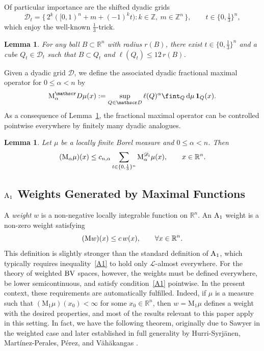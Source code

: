 \documentclass[11pt, a4paper, reqno]{amsart}
\newcommand{\R}{\mathbb R}
\newcommand{\Z}{\mathbb Z}
\newcommand{\Dy}{\mathscr D}
\newcommand{\A}{\textup A}
\newcommand{\dmu}{\,{\mathrm d\mu}}
\newcommand{\BV}{\textup{BV}}
\newtheorem{lemma}[theorem]{Lemma}
\theoremstyle{definition}
\theoremstyle{remark}
\begin{document}
Of particular importance are the shifted dyadic grids
\begin{equation*}\label{shiftdyadic}
\Dy_t = \{\,2^k([0,1)^n + m + (-1)^k t) : k\in\Z,\ m\in\Z^n\,\},
\qquad t\in\{0,\tfrac13\}^n,
\end{equation*}
which enjoy the well-known $\tfrac13$-trick.

\begin{lemma}\label{13trick}
For any ball $B\subset \R^n$ with radius $r(B)$, there exist $t\in\{0,\tfrac13\}^n$ and a cube $Q_t\in\Dy_t$ such that $B\subset Q_t$ and $\ell(Q_t)\le 12\,r(B)$.
\end{lemma}

Given a dyadic grid $\Dy$, we define the associated dyadic fractional maximal operator for $0\le\alpha<n$ by
\[
\textup{M}_\alpha^\Dy \mu(x)
:= \sup_{Q\in\Dy} \ell(Q)^\alpha \fint_Q \dmu \,\mathbf 1_Q(x).
\]
As a consequence of Lemma~\ref{13trick}, the fractional maximal operator can be controlled pointwise everywhere by finitely many dyadic analogues.

\begin{lemma}\label{dyadicbd}
Let $\mu$ be a locally finite Borel measure and $0\le\alpha<n$. Then
\[
(\textup{M}_\alpha \mu)(x)
\le c_{n,\alpha}\sum_{t\in\{0,\frac13\}^n} \textup{M}_\alpha^{\Dy_t}\mu(x),
\qquad x\in\R^n.
\]
\end{lemma}

\subsection{$\A_1$ Weights Generated by Maximal Functions}


A \emph{weight} $w$ is a non-negative locally integrable function on $\R^n$. An $\A_1$ weight is a non-zero weight satisfying
\begin{equation}\label{A1}
(\textup{M}w)(x)\le c\,w(x), \qquad \forall x\in \R^n.
\end{equation}
This definition is slightly stronger than the standard definition of $\A_1$, which typically requires inequality~\eqref{A1} to hold only $\mathcal L$-almost everywhere. For the theory of weighted $\BV$ spaces, however, the weights must be defined everywhere, be lower semicontinuous, and satisfy condition~\eqref{A1} pointwise. In the present context, these requirements are automatically fulfilled. Indeed, if $\mu$ is a measure such that $(\mathrm{M}_1\mu)(x_0)<\infty$ for some $x_0\in\R^n$, then $w=\mathrm{M}_1\mu$ defines a weight with the desired properties, and most of the results relevant to this paper apply in this setting. In fact, we have the following theorem, originally due to Sawyer \cite{Saw81two} in the weighted case and later established in full generality by Hurri-Syrj\"anen, Mart\'inez-Perales, Pérez, and V\"ah\"akangas \cite[Lemma~3.6]{HMPV}.
\end{document}
